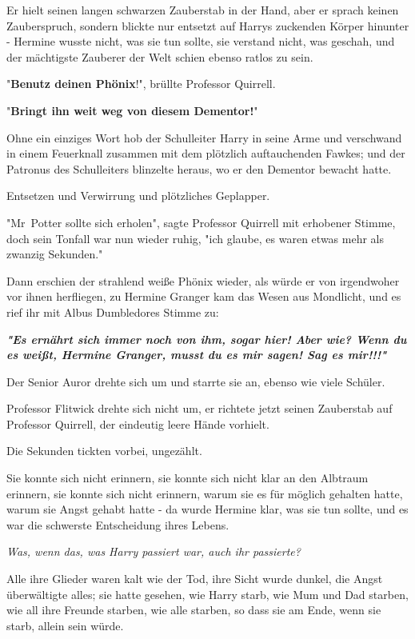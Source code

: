 {Er hielt seinen langen schwarzen Zauberstab in der Hand, aber er sprach keinen Zauberspruch, sondern blickte nur entsetzt auf Harrys zuckenden Körper hinunter - Hermine wusste nicht, was sie tun sollte, sie verstand nicht, was geschah, und der mächtigste Zauberer der Welt schien ebenso ratlos zu sein.

"\textbf{Benutz deinen Phönix}!", brüllte Professor Quirrell.

"\textbf{Bringt ihn weit weg von diesem Dementor!}"

Ohne ein einziges Wort hob der Schulleiter Harry in seine Arme und verschwand in einem Feuerknall zusammen mit dem plötzlich auftauchenden Fawkes; und der Patronus des Schulleiters blinzelte heraus, wo er den Dementor bewacht hatte.

Entsetzen und Verwirrung und plötzliches Geplapper.

"Mr~Potter sollte sich erholen", sagte Professor Quirrell mit erhobener Stimme, doch sein Tonfall war nun wieder ruhig, "ich glaube, es waren etwas mehr als zwanzig Sekunden."

Dann erschien der strahlend weiße Phönix wieder, als würde er von irgendwoher vor ihnen herfliegen, zu Hermine Granger kam das Wesen aus Mondlicht, und es rief ihr mit Albus Dumbledores Stimme zu:

\textbf{\emph{"Es ernährt sich immer noch von ihm, sogar hier! Aber wie? Wenn du es weißt, Hermine Granger, musst du es mir sagen! Sag es mir!!!"}}

Der Senior Auror drehte sich um und starrte sie an, ebenso wie viele Schüler.

Professor Flitwick drehte sich nicht um, er richtete jetzt seinen Zauberstab auf Professor Quirrell, der eindeutig leere Hände vorhielt.

Die Sekunden tickten vorbei, ungezählt.

Sie konnte sich nicht erinnern, sie konnte sich nicht klar an den Albtraum erinnern, sie konnte sich nicht erinnern, warum sie es für möglich gehalten hatte, warum sie Angst gehabt hatte - da wurde Hermine klar, was sie tun sollte, und es war die schwerste Entscheidung ihres Lebens.

\emph{Was, wenn das, was Harry passiert war, auch ihr passierte?}

Alle ihre Glieder waren kalt wie der Tod, ihre Sicht wurde dunkel, die Angst überwältigte alles; sie hatte gesehen, wie Harry starb, wie Mum und Dad starben, wie all ihre Freunde starben, wie alle starben, so dass sie am Ende, wenn sie starb, allein sein würde.

}
